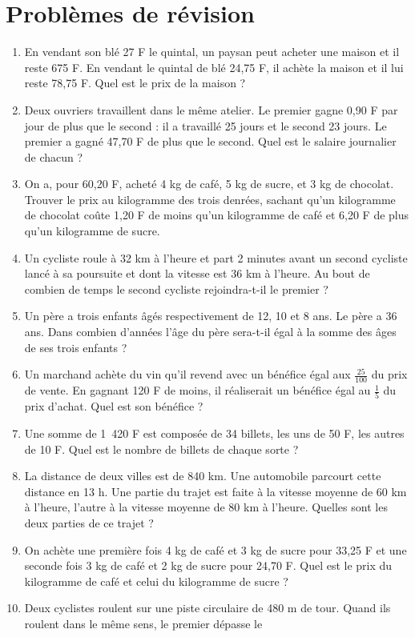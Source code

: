 
 \chapter{Problèmes de révision}
 \begin{enumerate}
 \item En vendant son blé 27 F le quintal, un paysan peut acheter une maison et il reste 675 F. En vendant le quintal de blé 24,75 F, il achète la maison et il lui reste 78,75 F. Quel est le prix de la maison ? 
 \item Deux ouvriers travaillent dans le même atelier. Le premier gagne 0,90 F par jour de plus que le second : il a travaillé 25 jours et le 
 second 23 jours. Le premier a gagné 47,70 F de plus que le second. Quel est le salaire journalier de chacun ? 
 \item On a, pour 60,20 F, acheté 4 kg de café, 5 kg de sucre, et 3 kg de chocolat. Trouver le prix au kilogramme des trois denrées, sachant qu'un kilogramme de chocolat coûte 1,20 F de moins qu'un kilogramme de café et 6,20 F de plus qu'un kilogramme de sucre. 
 \item Un cycliste roule à 32 km à l'heure et part 2 minutes avant un second cycliste lancé à sa poursuite et dont la vitesse est 36 km à l'heure. Au bout de combien de temps le second cycliste rejoindra-t-il 
 le premier ? 
 \item Un père a trois enfants âgés respectivement de 12, 10 et 8 ans. Le père a 36 ans. Dans combien d'années l'âge du père sera-t-il égal à
 la somme des âges de ses trois enfants ?
 \item Un marchand achète du vin qu'il revend avec un bénéfice égal aux $\frac{25}{100}$ du prix de vente. En gagnant 120 F de moins, il réaliserait un bénéfice égal au $\frac15$ du prix d'achat. Quel est
 son bénéfice ? 
 \item Une somme de 1~420 F est composée de 34 billets, les uns de 50 F, les autres de 10 F. Quel est le nombre de billets de chaque 
 sorte ? 
 \item La distance de deux villes est de 840 km. Une automobile parcourt cette distance en 13 h. Une partie du trajet est faite à la vitesse moyenne de 60 km à l'heure, l'autre à la vitesse moyenne de 80 km à l'heure. Quelles sont les deux parties de ce trajet ?
 \item  On achète une première fois 4 kg de café et 3 kg de sucre pour 33,25 F et une seconde fois 3 kg de café et 2 kg de sucre pour 24,70 F. Quel est le prix du kilogramme de café et celui du kilogramme de sucre ? 
 \item Deux cyclistes roulent sur une piste circulaire de 480 m de tour. Quand ils roulent dans le même sens, le premier dépasse le 

\end{enumerate}
